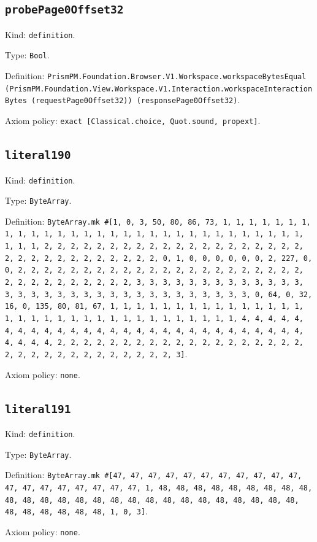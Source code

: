 \documentclass[11pt]{article}
\begin{document}
\subsection*{\texttt{probePage0Offset32}}
\noindent Kind: \texttt{definition}.\par
\noindent Type: \texttt{Bool}.\par
\noindent Definition: \texttt{PrismPM.Foundation.Browser.V1.Workspace.workspaceBytesEqual (PrismPM.Foundation.View.Workspace.V1.Interaction.workspaceInteractionBytes (requestPage0Offset32)) (responsePage0Offset32)}.\par
\noindent Axiom policy: \texttt{exact [Classical.choice, Quot.sound, propext]}.\par
\subsection*{\texttt{literal190}}
\noindent Kind: \texttt{definition}.\par
\noindent Type: \texttt{ByteArray}.\par
\noindent Definition: \texttt{ByteArray.mk \#[1, 0, 3, 50, 80, 86, 73, 1, 1, 1, 1, 1, 1, 1, 1, 1, 1, 1, 1, 1, 1, 1, 1, 1, 1, 1, 1, 1, 1, 1, 1, 1, 1, 1, 1, 1, 1, 1, 1, 1, 2, 2, 2, 2, 2, 2, 2, 2, 2, 2, 2, 2, 2, 2, 2, 2, 2, 2, 2, 2, 2, 2, 2, 2, 2, 2, 2, 2, 2, 2, 2, 2, 0, 1, 0, 0, 0, 0, 0, 0, 2, 227, 0, 0, 2, 2, 2, 2, 2, 2, 2, 2, 2, 2, 2, 2, 2, 2, 2, 2, 2, 2, 2, 2, 2, 2, 2, 2, 2, 2, 2, 2, 2, 2, 2, 2, 3, 3, 3, 3, 3, 3, 3, 3, 3, 3, 3, 3, 3, 3, 3, 3, 3, 3, 3, 3, 3, 3, 3, 3, 3, 3, 3, 3, 3, 3, 3, 3, 0, 64, 0, 32, 16, 0, 135, 80, 81, 67, 1, 1, 1, 1, 1, 1, 1, 1, 1, 1, 1, 1, 1, 1, 1, 1, 1, 1, 1, 1, 1, 1, 1, 1, 1, 1, 1, 1, 1, 1, 1, 1, 1, 4, 4, 4, 4, 4, 4, 4, 4, 4, 4, 4, 4, 4, 4, 4, 4, 4, 4, 4, 4, 4, 4, 4, 4, 4, 4, 4, 4, 4, 4, 4, 4, 2, 2, 2, 2, 2, 2, 2, 2, 2, 2, 2, 2, 2, 2, 2, 2, 2, 2, 2, 2, 2, 2, 2, 2, 2, 2, 2, 2, 2, 2, 2, 2, 3]}.\par
\noindent Axiom policy: \texttt{none}.\par
\subsection*{\texttt{literal191}}
\noindent Kind: \texttt{definition}.\par
\noindent Type: \texttt{ByteArray}.\par
\noindent Definition: \texttt{ByteArray.mk \#[47, 47, 47, 47, 47, 47, 47, 47, 47, 47, 47, 47, 47, 47, 47, 47, 47, 47, 47, 1, 48, 48, 48, 48, 48, 48, 48, 48, 48, 48, 48, 48, 48, 48, 48, 48, 48, 48, 48, 48, 48, 48, 48, 48, 48, 48, 48, 48, 48, 48, 48, 48, 1, 0, 3]}.\par
\noindent Axiom policy: \texttt{none}.\par
\end{document}
